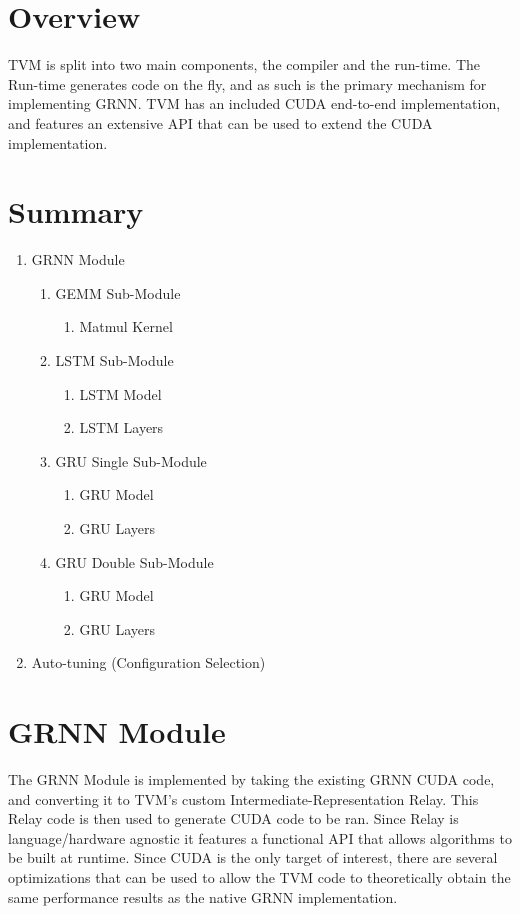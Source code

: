 \documentclass{scrreprt}
\begin{document}
\section{Overview}
TVM is split into two main components, the compiler and the run-time.  The Run-time generates code on the fly, and as
such is the primary mechanism for implementing GRNN. TVM has an included CUDA end-to-end implementation, and features
an extensive API that can be used to extend the CUDA implementation.

\section{Summary}
\begin{enumerate}
\item GRNN Module\footnotemark[1]
\begin{enumerate}
\item GEMM Sub-Module\footnotemark[2]
\begin{enumerate}
\item Matmul Kernel
\end{enumerate}
\item LSTM Sub-Module\footnotemark[2]
\begin{enumerate}
\item LSTM Model
\item LSTM Layers
\end{enumerate}
\item GRU Single Sub-Module\footnotemark[2]
\begin{enumerate}
\item GRU Model
\item GRU Layers
\end{enumerate}
\item GRU Double Sub-Module\footnotemark[2]
\begin{enumerate}
\item GRU Model
\item GRU Layers
\end{enumerate}
\end{enumerate}
\item Auto-tuning (Configuration Selection)
\end{enumerate}

\section{GRNN Module}
The GRNN Module is implemented by taking the existing GRNN CUDA code, and converting it to TVM's custom
Intermediate-Representation Relay. This Relay code is then used to generate CUDA code to be ran. Since Relay is
language/hardware agnostic it features a functional API that allows algorithms to be built at runtime. Since CUDA is the
only target of interest, there are several optimizations that can be used to allow the TVM code to theoretically obtain
the same performance results as the native GRNN implementation.
\end{document}
